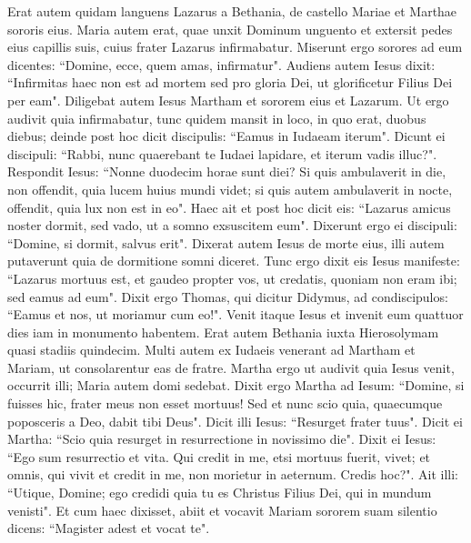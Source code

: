 \begin{biblechapter} 
\verse Erat autem quidam languens Lazarus a Bethania, de castello Mariae et Marthae sororis eius.  
\verse Maria autem erat, quae unxit Dominum unguento et extersit pedes eius capillis suis, cuius frater Lazarus infirmabatur. 
\verse Miserunt ergo sorores ad eum dicentes: “Domine, ecce, quem amas, infirmatur". 
\verse Audiens autem Iesus dixit: “Infirmitas haec non est ad mortem sed pro gloria Dei, ut glorificetur Filius Dei per eam". 
\verse Diligebat autem Iesus Martham et sororem eius et Lazarum. 
\verse Ut ergo audivit quia infirmabatur, tunc quidem mansit in loco, in quo erat, duobus diebus; 
\verse deinde post hoc dicit discipulis: “Eamus in Iudaeam iterum". 
\verse Dicunt ei discipuli: “Rabbi, nunc quaerebant te Iudaei lapidare, et iterum vadis illuc?". 
\verse Respondit Iesus: “Nonne duodecim horae sunt diei? Si quis ambulaverit in die, non offendit, quia lucem huius mundi videt; 
\verse si quis autem ambulaverit in nocte, offendit, quia lux non est in eo". 
\verse Haec ait et post hoc dicit eis: “Lazarus amicus noster dormit, sed vado, ut a somno exsuscitem eum".  
\verse Dixerunt ergo ei discipuli: “Domine, si dormit, salvus erit". 
\verse Dixerat autem Iesus de morte eius, illi autem putaverunt quia de dormitione somni diceret. 
\verse Tunc ergo dixit eis Iesus manifeste: “Lazarus mortuus est, 
\verse et gaudeo propter vos, ut credatis, quoniam non eram ibi; sed eamus ad eum". 
\verse Dixit ergo Thomas, qui dicitur Didymus, ad condiscipulos: “Eamus et nos, ut moriamur cum eo!". 
\verse Venit itaque Iesus et invenit eum quattuor dies iam in monumento habentem.  
\verse Erat autem Bethania iuxta Hierosolymam quasi stadiis quindecim. 
\verse Multi autem ex Iudaeis venerant ad Martham et Mariam, ut consolarentur eas de fratre.  
\verse Martha ergo ut audivit quia Iesus venit, occurrit illi; Maria autem domi sedebat. 
\verse Dixit ergo Martha ad Iesum: “Domine, si fuisses hic, frater meus non esset mortuus! 
\verse Sed et nunc scio quia, quaecumque poposceris a Deo, dabit tibi Deus". 
\verse Dicit illi Iesus: “Resurget frater tuus".  
\verse Dicit ei Martha: “Scio quia resurget in resurrectione in novissimo die".  
\verse Dixit ei Iesus: “Ego sum resurrectio et vita. Qui credit in me, etsi mortuus fuerit, vivet; 
\verse et omnis, qui vivit et credit in me, non morietur in aeternum. Credis hoc?". 
\verse Ait illi: “Utique, Domine; ego credidi quia tu es Christus Filius Dei, qui in mundum venisti". 
\verse Et cum haec dixisset, abiit et vocavit Mariam sororem suam silentio dicens: “Magister adest et vocat te". 

\end{biblechapter}
